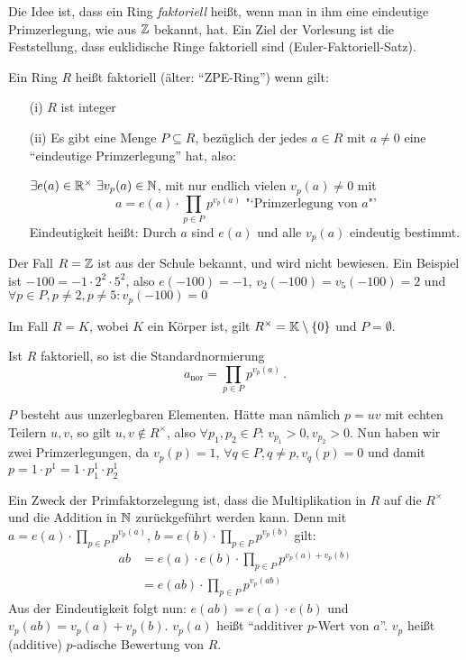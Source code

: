 \documentclass[a4paper,DIV15,BCOR12mm]{article}
\begin{document}
Die Idee ist, dass ein Ring \emph{faktoriell} heißt, wenn man in ihm
eine eindeutige Primzerlegung, wie aus $\mathbb{Z}$ bekannt, hat. Ein Ziel
der Vorlesung ist die Feststellung, dass euklidische Ringe
faktoriell sind (Euler-Faktoriell-Satz).

\begin{definition}
Ein Ring $R$ heißt faktoriell (älter: "`ZPE-Ring"') wenn gilt:
\begin{itemize}
\item[(i)] $R$ ist integer
\item[(ii)] Es gibt eine Menge $P\subseteq R$, bezüglich der jedes $a\in R$ mit $a\ne 0$ eine "`eindeutige Primzerlegung"' hat, also:

$\exists e(a)\in\mathbb{R}^\times \ \exists v_p(a) \in \mathbb{N}$, mit nur
endlich vielen $v_p(a)\ne 0$ mit
\[a = e(a) \cdot \prod_{p\in P} p^{v_p(a)} \text{ "`Primzerlegung von $a$"'}\]
Eindeutigkeit heißt: Durch $a$ sind $e(a)$ und alle $v_p(a)$
eindeutig bestimmt.
\end{itemize}
\end{definition}

Der Fall $R=\mathbb{Z}$ ist aus der Schule bekannt, und wird nicht
bewiesen. Ein Beispiel ist $-100 = -1 \cdot 2^2 \cdot 5^2$, also
$e(-100)=-1$, $v_2(-100)=v_5(-100)=2$ und $\forall p\in P, p\ne 2,
p\ne5: v_p(-100)=0$

Im Fall $R=K$, wobei $K$ ein Körper ist, gilt
$R^\times=\mathbb{K}\setminus\{0\}$ und $ P=\emptyset$.

Ist $R$ faktoriell, so ist die Standardnormierung \[a_\text{nor} =
\prod_{p\in P} p^{v_p(a)}\,.\]

\begin{bemerkung}
$P$ besteht aus unzerlegbaren Elementen. Hätte man nämlich $p=uv$
mit echten Teilern $u,v$, so gilt $u,v\notin R^\times$, also
$\forall p_1,p_2 \in P$: $v_{p_1}>0,v_{p_2}>0$. Nun haben wir zwei
Primzerlegungen, da $v_p(p) = 1$, $\forall q\in P, q\ne p, v_q(p)=0$
und damit $p=1 \cdot p^1 = 1\cdot p_1^1 \cdot p_2^1$
\end{bemerkung}

Ein Zweck der Primfaktorzelegung ist, dass die Multiplikation in $R$
auf die $R^\times$ und die Addition in $\mathbb{N}$ zurückgeführt werden
kann. Denn mit $a=e(a) \cdot \prod_{p\in P} p^{v_p(a)}$, $b=e(b)
\cdot \prod_{p\in P} p^{v_p(b)}$ gilt:
\begin{align*}
ab &= e(a) \cdot e(b) \cdot \prod_{p\in P} p^{v_p(a) + v_p(b)} \\
   &= e(ab)\cdot \prod_{p\in P} p^{v_p(ab)}
\end{align*}
Aus der Eindeutigkeit folgt nun: $e(ab) = e(a) \cdot e(b)$ und
$v_p(ab) = v_p(a)+ v_p(b)$. $v_p(a)$ heißt "`additiver $p$-Wert
von $a$"'. $v_p$ heißt (additive) $p$-adische Bewertung von $R$.
\end{document}
